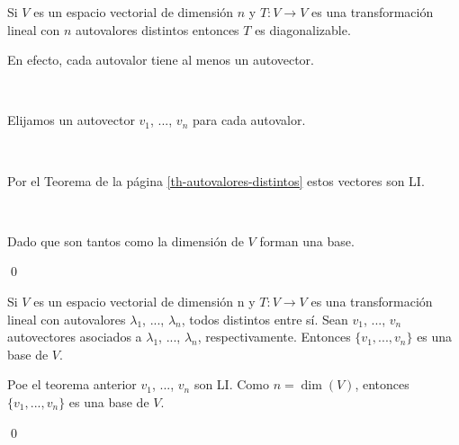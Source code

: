 \documentclass[handout]{beamer} %
\begin{document}
\begin{frame}
    
    \begin{corolario}        
        Si $V$ es un espacio vectorial de dimensión $n$ y $T:V\longrightarrow V$ es una transformación lineal con $n$ autovalores distintos entonces $T$ es diagonalizable.
        
    \end{corolario}\pause
    
    \begin{demostracion}\pause
        En efecto, cada autovalor tiene al menos un autovector. 
    
    \
    
    Elijamos un autovector $v_1$, ..., $v_n$ para cada autovalor.
    
    \
    
    Por el Teorema de la página \ref{th-autovalores-distintos} estos vectores son LI. 
    
    \
    
    Dado que son tantos como la dimensión de $V$ forman una base.

    \qed
    \end{demostracion}
    
\end{frame}

\begin{frame}
    
    \begin{corolario}
        Si $V$ es un espacio vectorial de dimensión n y $T:V\longrightarrow V$ es una transformación lineal con autovalores $\lambda_1$, ..., $\lambda_n$, todos distintos entre sí. Sean $v_1$, ..., $v_n$ autovectores asociados a $\lambda_1$, ..., $\lambda_n$, respectivamente. Entonces $\{v_1, ..., v_n\}$ es una base de $V$.
    \end{corolario}\pause
    
    \begin{demostracion}\pause
        Poe  el teorema anterior $v_1$, ..., $v_n$ son LI. Como $n= \dim(V)$, entonces  $\{v_1, ..., v_n\}$ es una base de $V$.
        
        \qed
    \end{demostracion}
    
\end{frame}
\end{document}
